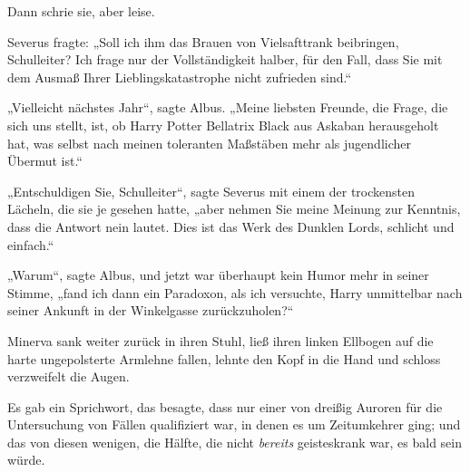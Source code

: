 Dann schrie sie, aber leise.

Severus fragte:
„Soll ich ihm das Brauen von Vielsafttrank beibringen, Schulleiter? Ich frage nur der Vollständigkeit halber, für den Fall, dass Sie mit dem Ausmaß Ihrer Lieblingskatastrophe nicht zufrieden sind.“

„Vielleicht nächstes Jahr“, sagte Albus.
„Meine liebsten Freunde, die Frage, die sich uns stellt, ist, ob Harry Potter Bellatrix Black aus Askaban herausgeholt hat, was selbst nach meinen toleranten Maßstäben mehr als jugendlicher Übermut ist.“

„Entschuldigen Sie, Schulleiter“, sagte Severus mit einem der trockensten Lächeln, die sie je gesehen hatte, „aber nehmen Sie meine Meinung zur Kenntnis, dass die Antwort nein lautet. Dies ist das Werk des Dunklen Lords, schlicht und einfach.“

„Warum“, sagte Albus, und jetzt war überhaupt kein Humor mehr in seiner Stimme, „fand ich dann ein Paradoxon, als ich versuchte, Harry unmittelbar nach seiner Ankunft in der Winkelgasse zurückzuholen?“

Minerva sank weiter zurück in ihren Stuhl, ließ ihren linken Ellbogen auf die harte ungepolsterte Armlehne fallen, lehnte den Kopf in die Hand und schloss verzweifelt die Augen.

Es gab ein Sprichwort, das besagte, dass nur einer von dreißig Auroren für die Untersuchung von Fällen qualifiziert war, in denen es um Zeitumkehrer ging; und das von diesen wenigen, die Hälfte, die nicht \emph{bereits} geisteskrank war, es bald sein würde.

